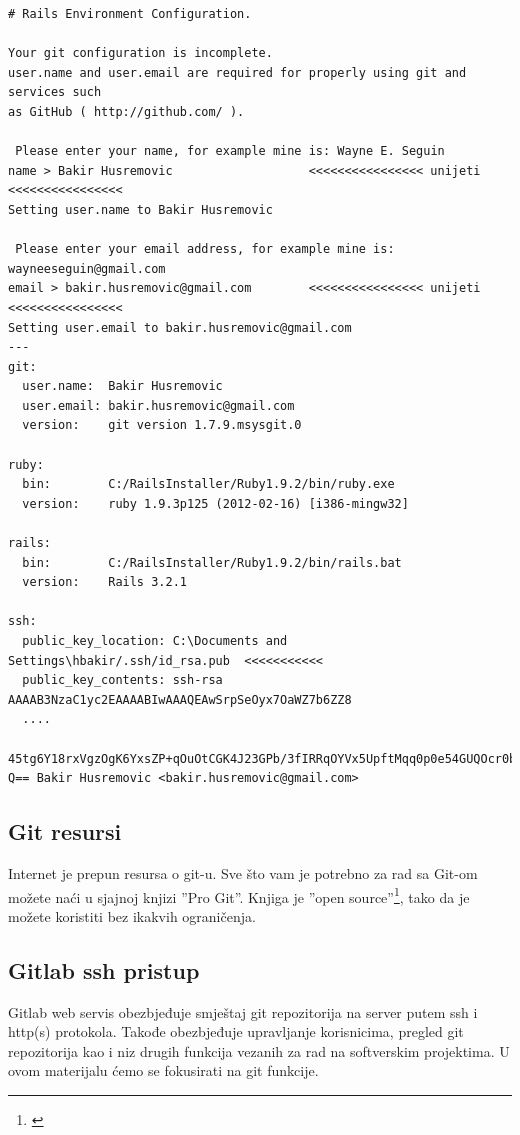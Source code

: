 \documentclass[times, utf8, seminar]{fit}
\begin{document}
\begin{lstlisting}
# Rails Environment Configuration.

Your git configuration is incomplete.
user.name and user.email are required for properly using git and services such
as GitHub ( http://github.com/ ).

 Please enter your name, for example mine is: Wayne E. Seguin
name > Bakir Husremovic                   <<<<<<<<<<<<<<<< unijeti <<<<<<<<<<<<<<<<
Setting user.name to Bakir Husremovic

 Please enter your email address, for example mine is: wayneeseguin@gmail.com
email > bakir.husremovic@gmail.com        <<<<<<<<<<<<<<<< unijeti <<<<<<<<<<<<<<<<
Setting user.email to bakir.husremovic@gmail.com
---
git:
  user.name:  Bakir Husremovic
  user.email: bakir.husremovic@gmail.com
  version:    git version 1.7.9.msysgit.0

ruby:
  bin:        C:/RailsInstaller/Ruby1.9.2/bin/ruby.exe
  version:    ruby 1.9.3p125 (2012-02-16) [i386-mingw32]

rails:
  bin:        C:/RailsInstaller/Ruby1.9.2/bin/rails.bat
  version:    Rails 3.2.1

ssh:
  public_key_location: C:\Documents and Settings\hbakir/.ssh/id_rsa.pub  <<<<<<<<<<<
  public_key_contents: ssh-rsa AAAAB3NzaC1yc2EAAAABIwAAAQEAwSrpSeOyx7OaWZ7b6ZZ8
  ....
  45tg6Y18rxVgzOgK6YxsZP+qOuOtCGK4J23GPb/3fIRRqOYVx5UpftMqq0p0e54GUQOcr0bS+/ooYNC
Q== Bakir Husremovic <bakir.husremovic@gmail.com>
\end{lstlisting}

\subsection{Git resursi}

Internet je prepun resursa o git-u. Sve što vam je potrebno za rad sa Git-om možete naći u sjajnoj knjizi ''Pro Git''\citep{progit}. Knjiga je ''open source''\footnote{\href{https://github.s3.amazonaws.com/media/progit.en.pdf}{\color{blue}{PDF download}}}, tako da je možete koristiti bez ikakvih ograničenja.

\subsection{Gitlab ssh pristup}

Gitlab web servis obezbjeđuje smještaj git repozitorija na server putem ssh i http(s) protokola.
Takođe obezbjeđuje upravljanje korisnicima, pregled git repozitorija kao i niz drugih funkcija vezanih za rad na softverskim projektima.
U ovom materijalu ćemo se fokusirati na git funkcije.
\end{document}
